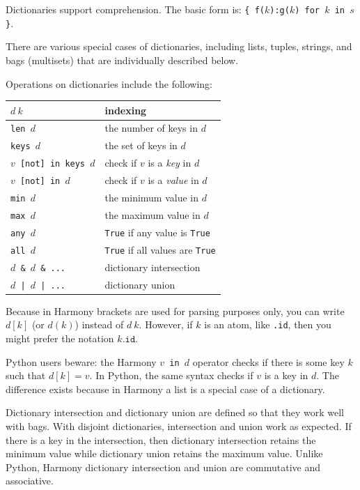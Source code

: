 \documentclass{report}
\begin{document}
Dictionaries support comprehension.  The  basic form is:
\texttt{\{ f($k$):g($k$) for $k$ in $s$ \}}.

There are various special cases of dictionaries,
including lists, tuples, strings,
and bags (multisets) that are individually described below.

Operations on dictionaries include the following:

\begin{center}
\begin{tabular}{|l|l|}
\hline
\texttt{$d~k$} & indexing \\
\hline
\texttt{len $d$} & the number of keys in $d$ \\
\hline
\texttt{keys $d$} & the set of keys in $d$ \\
\hline
\texttt{$v$ [not] in keys $d$} & check if $v$ is a \emph{key} in $d$ \\
\hline
\texttt{$v$ [not] in $d$} & check if $v$ is a \emph{value} in $d$ \\
\hline
\texttt{min $d$} & the minimum value in $d$ \\
\hline
\texttt{max $d$} & the maximum value in $d$ \\
\hline
\texttt{any $d$} & \texttt{True} if any value is \texttt{True} \\
\hline
\texttt{all $d$} & \texttt{True} if all values are \texttt{True} \\
\hline
\texttt{$d$ \& $d$ \& ...} & dictionary intersection \\
\hline
\texttt{$d$ | $d$ | ...} & dictionary union \\
\hline
\end{tabular}
\end{center}

Because in Harmony brackets are used for parsing purposes only,
you can write $d[k]$ (or $d(k)$) instead of $d~k$.
However, if $k$ is an atom, like \texttt{.id}, then you might
prefer the notation $k\mathtt{.id}$.

Python users beware: the Harmony \texttt{$v$ in $d$} operator checks
if there is some key $k$ such that $d[k] = v$.  In Python, the same
syntax checks if $v$ is a key in $d$.  The difference exists because
in Harmony a list is a special case of a dictionary.

Dictionary intersection and dictionary union are defined so that
they work well with bags.  With disjoint dictionaries, intersection
and union work as expected.  If there is a key in the intersection, then
dictionary intersection retains the minimum value while dictionary
union retains the maximum value.  Unlike Python, Harmony
dictionary intersection and union are commutative and associative.
\end{document}
